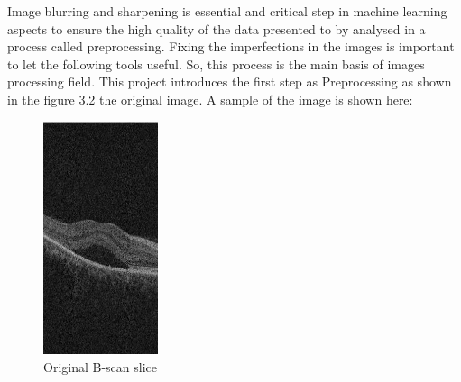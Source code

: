 Image blurring and sharpening is essential and critical step in machine learning aspects to ensure the high quality of the data presented to by analysed in a process called preprocessing.
Fixing the imperfections in the images is important to let the following tools useful.
So, this process is the main basis of images processing field. 
This project introduces the first step as Preprocessing as shown in the figure 3.2 the original image.
A sample of the image is shown here:
\begin{figure}[htb]
        \centering
        \includegraphics[width = 0.3\textwidth, height = 0.2\textheight]{figures/Original-image.jpg} %
  \caption{Original B-scan slice}
  \label{fig:Original image}
\end{figure}

